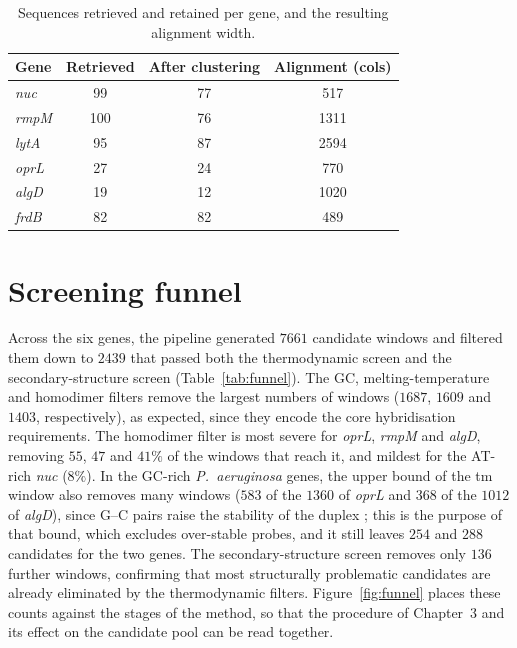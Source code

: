 \begin{table}[H]
\begin{center}
\begin{tabular}{l c c c}
\hline
\textbf{Gene} & \textbf{Retrieved} & \textbf{After clustering} & \textbf{Alignment (cols)} \\
\hline
\emph{nuc}  & 99  & 77 & 517 \\
\emph{rmpM} & 100 & 76 & 1311 \\
\emph{lytA} & 95  & 87 & 2594 \\
\emph{oprL} & 27  & 24 & 770 \\
\emph{algD} & 19  & 12 & 1020 \\
\emph{frdB} & 82  & 82 & 489 \\
\hline
\end{tabular}
\end{center}
\caption{Sequences retrieved and retained per gene, and the resulting alignment width.}
\label{tab:retrieval}
\end{table}

\section{Screening funnel}
\label{sec:funnel}

Across the six genes, the pipeline generated $7661$ candidate windows and filtered them down to
$2439$ that passed both the thermodynamic screen and the secondary-structure screen
(Table~\ref{tab:funnel}). The GC, melting-temperature and homodimer filters remove the largest numbers
of windows ($1687$, $1609$ and $1403$, respectively), as expected, since they encode the core
hybridisation requirements. The homodimer filter is most severe for \emph{oprL}, \emph{rmpM} and
\emph{algD}, removing $55$, $47$ and $41\%$ of the windows that reach it, and mildest for the AT-rich
\emph{nuc} ($8\%$). In the GC-rich \emph{P.\ aeruginosa} genes, the upper bound of the \acrshort{tm}
window also removes many windows ($583$ of the $1360$ of \emph{oprL} and $368$ of the $1012$ of
\emph{algD}), since G--C pairs raise the stability of the duplex \citep{santalucia2004}; this is the
purpose of that bound, which excludes over-stable probes, and it still leaves $254$ and $288$ candidates
for the two genes. The secondary-structure screen removes only $136$ further windows, confirming that
most structurally problematic candidates are already eliminated by the thermodynamic filters.
Figure~\ref{fig:funnel} places these counts against the stages of the method, so that the
procedure of Chapter~3 and its effect on the candidate pool can be read together.

